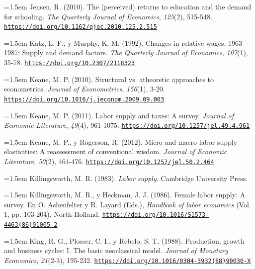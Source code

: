 \documentclass[10pt,a4paper]{article}
\begin{document}
\noindent\hangindent=1.5em Jensen, R. (2010). The (perceived) returns to education and the demand for schooling. \textit{The Quarterly Journal of Economics}, \textit{125}(2), 515-548. \href{https://doi.org/10.1162/qjec.2010.125.2.515}{\nolinkurl{https://doi.org/10.1162/qjec.2010.125.2.515}}

\noindent\hangindent=1.5em Katz, L. F., y Murphy, K. M. (1992). Changes in relative wages, 1963-1987: Supply and demand factors. \textit{The Quarterly Journal of Economics}, \textit{107}(1), 35-78. \href{https://doi.org/10.2307/2118323}{\nolinkurl{https://doi.org/10.2307/2118323}}

\noindent\hangindent=1.5em Keane, M. P. (2010). Structural vs. atheoretic approaches to econometrics. \textit{Journal of Econometrics}, \textit{156}(1), 3-20. \href{https://doi.org/10.1016/j.jeconom.2009.09.003}{\nolinkurl{https://doi.org/10.1016/j.jeconom.2009.09.003}}

\noindent\hangindent=1.5em Keane, M. P. (2011). Labor supply and taxes: A survey. \textit{Journal of Economic Literature}, \textit{49}(4), 961-1075. \href{https://doi.org/10.1257/jel.49.4.961}{\nolinkurl{https://doi.org/10.1257/jel.49.4.961}}

\noindent\hangindent=1.5em Keane, M. P., y Rogerson, R. (2012). Micro and macro labor supply elasticities: A reassessment of conventional wisdom. \textit{Journal of Economic Literature}, \textit{50}(2), 464-476. \href{https://doi.org/10.1257/jel.50.2.464}{\nolinkurl{https://doi.org/10.1257/jel.50.2.464}}

\noindent\hangindent=1.5em Killingsworth, M. R. (1983). \textit{Labor supply}. Cambridge University Press.

{\sloppy\noindent\hangindent=1.5em Killingsworth, M. R., y Heckman, J. J. (1986). Female labor supply: A survey. En O. Ashenfelter y R. Layard (Eds.), \textit{Handbook of labor economics} (Vol. 1, pp. 103-204). North-Holland. \href{https://doi.org/10.1016/S1573-4463(86)01005-2}{\nolinkurl{https://doi.org/10.1016/S1573-4463(86)01005-2}}\par}

\noindent\hangindent=1.5em King, R. G., Plosser, C. I., y Rebelo, S. T. (1988). Production, growth and business cycles: I. The basic neoclassical model. \textit{Journal of Monetary Economics}, \textit{21}(2-3), 195-232. \href{https://doi.org/10.1016/0304-3932(88)90030-X}{\nolinkurl{https://doi.org/10.1016/0304-3932(88)90030-X}}
\end{document}
